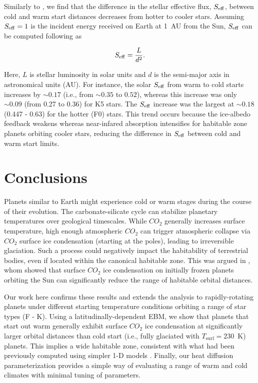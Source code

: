 \documentclass[fleqn,usenatbib]{mnras}
\begin{document}
Similarly to \citet{kadoya_outer_2019}, we find that the difference in the stellar effective flux, $S_{\rm eff}$, between cold and warm start distances decreases from hotter to cooler stars. Assuming $S_{\rm eff}=1$ is the incident energy received on Earth at 1~AU from the Sun, $S_{\rm eff}$ can be computed following \citet{kasting1993} as

\begin{equation}
S_{\rm eff} = \frac{L}{d^{2}}.
\end{equation}

Here, $L$ is stellar luminosity in solar units and $d$ is the semi-major axis in astronomical units (AU). For instance, the solar $S_{\rm eff}$ from warm to cold starts increases by $\sim 0.17$ (i.e., from $\sim 0.35$ to $0.52$), whereas this increase was only $\sim 0.09$ (from 0.27 to 0.36) for K5 stars. The $S_{\rm eff}$ increase was the largest at $\sim 0.18$ (0.447 - 0.63) for the hotter (F0) stars. This trend occurs because the ice-albedo feedback weakens whereas near-infared absorption intensifies for habitable zone planets orbiting cooler stars, reducing the difference in $S_{\rm eff}$ between cold and warm start limits. 

\section{Conclusions}
Planets similar to Earth might experience cold or warm stages during the course of their evolution. The carbonate-silicate cycle can stabilize planetary temperatures over geological timescales. While  $CO_{\mathrm{2}}$ generally increases surface temperature, high enough atmospheric $CO_{\mathrm{2}}$ can trigger atmospheric collapse via $CO_{\mathrm{2}}$ surface ice condensation (starting at the poles), leading to irreversible glaciation. Such a process could negatively impact the habitability of terrestrial bodies, even if located within the canonical habitable zone. This was argued in \citet{Turbet2017}, whom showed that surface $CO_{\mathrm{2}}$ ice condensation on initially frozen planets orbiting the Sun can significantly reduce the range of habitable orbital distances. 

Our work here confirms these results and extends the analysis to rapidly-rotating planets under different starting temperature conditions orbiting a range of star types (F - K). Using a latitudinally-dependent EBM, we show that planets that start out warm generally exhibit surface $CO_{\mathrm{2}}$ ice condensation at significantly larger orbital distances than cold start (i.e., fully glaciated with $T_{\mathrm{surf}}=230$~K) planets. This implies a wide habitable zone, consistent with what had been previously computed using simpler 1-D models \citep{kasting1993,KumarKopparapu2013,Ramirez2018}. Finally, our heat diffusion parameterization provides a simple way of evaluating a range of warm and cold climates with minimal tuning of parameters. 
\end{document}
